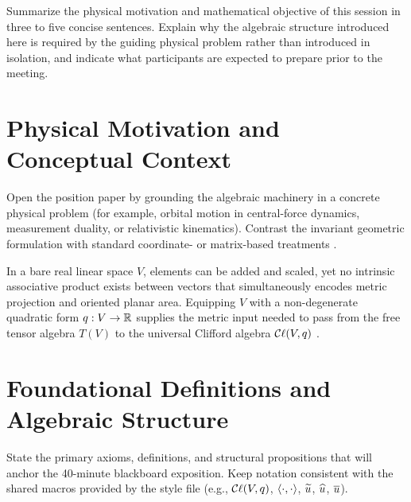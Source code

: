 \documentclass[11pt,a4paper]{article}
\begin{document}
\makeseminarheader

\begin{seminarabstract}
  Summarize the physical motivation and mathematical objective of this
  session in three to five concise sentences. Explain why the algebraic
  structure introduced here is required by the guiding physical problem rather
  than introduced in isolation, and indicate what participants are expected
  to prepare prior to the meeting.
\end{seminarabstract}

\section{Physical Motivation and Conceptual Context}
\label{sec:motivation}

Open the position paper by grounding the algebraic machinery in a concrete
physical problem (for example, orbital motion in central-force dynamics,
measurement duality, or relativistic kinematics). Contrast the invariant
geometric formulation with standard coordinate- or matrix-based treatments
\cite{hestenesOerstedMedalLecture2003,doranGeometricAlgebraPhysicists2013}.

In a bare real linear space $V$, elements can be added and scaled, yet no
intrinsic associative product exists between vectors that simultaneously
encodes metric projection and oriented planar area. Equipping $V$ with a
non-degenerate quadratic form $q : V \to \mathbb{R}$ supplies the metric input needed
to pass from the free tensor algebra $T(V)$ to the universal Clifford algebra
$\mathcal{C}\ell(V, q)$ \cite[Chap.~2]{vazIntroductionCliffordAlgebras2016}.

\section{Foundational Definitions and Algebraic Structure}
\label{sec:definitions}

State the primary axioms, definitions, and structural propositions that will
anchor the 40-minute blackboard exposition. Keep notation consistent with the
shared macros provided by the style file (e.g., $\mathcal{C}\ell(V,q)$,
$\langle \cdot, \cdot \rangle$, $\widetilde{u}$, $\widehat{u}$, $\overline{u}$).
\end{document}
